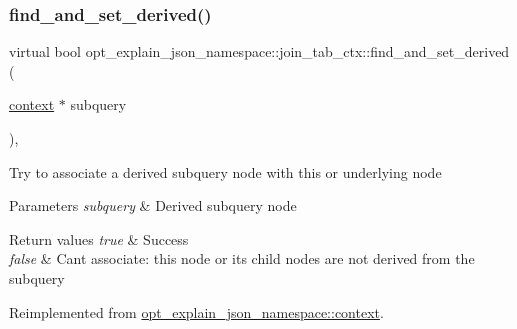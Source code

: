 \mbox{\label{classopt__explain__json__namespace_1_1join__tab__ctx_afc798daee06122e7680cd80245fdf54d}} 
\subsubsection{\texorpdfstring{find\+\_\+and\+\_\+set\+\_\+derived()}{find\_and\_set\_derived()}}
{\footnotesize\ttfamily virtual bool opt\+\_\+explain\+\_\+json\+\_\+namespace\+::join\+\_\+tab\+\_\+ctx\+::find\+\_\+and\+\_\+set\+\_\+derived (\begin{DoxyParamCaption}\item[{\mbox{\hyperlink{classopt__explain__json__namespace_1_1context}{context}} $\ast$}]{subquery }\end{DoxyParamCaption})\hspace{0.3cm}{\ttfamily [inline]}, {\ttfamily [virtual]}}

Try to associate a derived subquery node with this or underlying node


\begin{DoxyParams}{Parameters}
{\em subquery} & Derived subquery node\\
\hline
\end{DoxyParams}

\begin{DoxyRetVals}{Return values}
{\em true} & Success \\
\hline
{\em false} & Can\textquotesingle{}t associate\+: this node or its child nodes are not derived from the subquery \\
\hline
\end{DoxyRetVals}


Reimplemented from \mbox{\hyperlink{classopt__explain__json__namespace_1_1context_afe66d6ec1a0f56114bc2b493b084c1a0}{opt\+\_\+explain\+\_\+json\+\_\+namespace\+::context}}.

\mbox{\label{classopt__explain__json__namespace_1_1join__tab__ctx_a74c2ce48b173e41e0878b549ea44e4b0}} 
